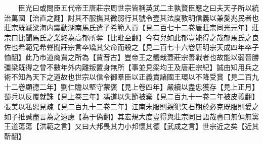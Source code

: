 　　臣光曰或問臣五代帝王唐莊宗周世宗皆稱英武二主孰賢臣應之曰夫天子所以統治萬國【治直之翻】討其不服撫其微弱行其號令壹其法度敦明信義以兼愛兆民者也莊宗既滅梁海内震動湖南馬氏遣子希範入貢【見二百七十二卷唐莊宗同光元年】莊宗曰比聞馬氏之業終為高郁所奪【比毗至翻】今有兒如此郁豈能得之哉郁馬氏之良佐也希範兄希聲聞莊宗言卒矯其父命而殺之【見二百七十六卷唐明宗天成四年卒子恤翻】此乃市道商賈之所為【賈音古】豈帝王之體哉蓋莊宗善戰者也故能以弱晉勝彊梁既得之曾不數年外内離叛置身無所【事並見梁均王及唐莊宗紀】誠由知用兵之術不知為天下之道故也世宗以信令御羣臣以正義責諸國王環以不降受賞【見二百九十二卷顯德二年】劉仁贍以堅守蒙褒【見上卷四年】嚴續以盡忠獲存【見上正月】蜀兵以反覆就誅【見上卷三年】馮道以失節被棄【見二百九十一卷二年被皮義翻】張美以私恩見疎【見二百九十二卷二年】江南未服則親犯矢石期於必克既服則愛之如子推誠盡言為之遠慮【為于偽翻】其宏規大度豈得與莊宗同日語哉書曰無偏無黨王道蕩蕩【洪範之言】又曰大邦畏其力小邦懷其德【武成之言】世宗近之矣【近其靳翻】

